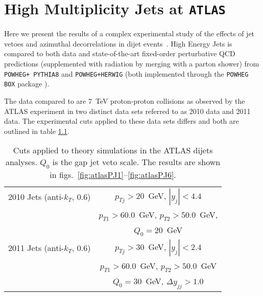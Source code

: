 \chapter{High Multiplicity Jets at \texttt{ATLAS}}
\label{chap:ATLAS}

	Here we present the results of a complex experimental study of the effects of jet vetoes and
	azimuthal decorrelations in dijet events~\cite{Aad:2014pua}.  High Energy Jets is compared
	to both data and state-of-the-art fixed-order perturbative QCD predictions (supplemented with
	radiation by merging with a parton shower) from \texttt{POWHEG+
	PYTHIA8} and \texttt{POWHEG+HERWIG} (both implemented through the \texttt{POWHEG BOX} package
	\cite{1126-6708-2004-11-040}).

	The data compared to are 7~TeV proton-proton collisions as observed by the ATLAS
	experiment in two distinct data sets referred to as 2010 data and 2011 data.  The
	experimental cuts applied to these data sets differs and both are outlined in table
	\ref{tab:atlasPcuts}.

	\begin{table}[bth]
	  \centering
	  \begin{tabular}{|l|c|}
	    \hline
	    2010 Jets (anti-$k_T$, 0.6) & $p_{Tj}>20$~GeV, \; $|y_j|<4.4$ \\
	    & $p_{T1}> 60.0$~GeV, \; $p_{T2}> 50.0$~GeV, \; \\
	    & $Q_0=20$~GeV \\
	    \hline
	    2011 Jets (anti-$k_T$, 0.6) & $p_{Tj}>30$~GeV, \; $|y_j|<2.4$ \\
	    & $p_{T1}> 60.0$~GeV, \; $p_{T2}> 50.0$~GeV \\
	    & \; $Q_0=30$~GeV, \; $\Delta y_{jj}>1.0$\\
	\hline
	  \end{tabular}
	  \caption{Cuts applied to theory simulations in the ATLAS dijets analyses.
	  $Q_0$ is the gap jet veto scale. The results are shown in
	  figs.~\eqref{fig:atlasPJ1}--\eqref{fig:atlasPJ6}.}
	  \label{tab:atlasPcuts}
	\end{table}

